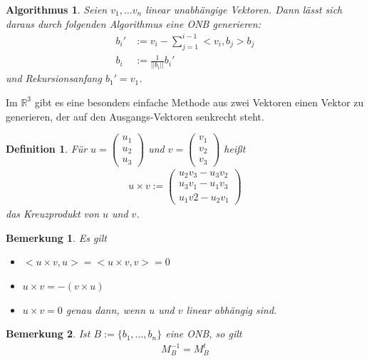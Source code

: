 \documentclass[]{article}
\newtheorem{Definition}{Definition}
\newtheorem{Bemerkung}{Bemerkung}
\newtheorem{Algorithmus}{Algorithmus}
\begin{document}
\begin{Algorithmus}
Seien  $v_1, \hdots v_n$ linear unabhängige Vektoren.  Dann lässt sich daraus durch folgenden Algorithmus 
eine ONB generieren: 
\begin {align*}
b_i ' & := v_i - \sum_{j=1}^{i-1} <v_i, b_j> b_j \\
b_i  & :=  \frac{1}{||b_i||} b_i'
\end{align*}
und Rekursionsanfang $b_1' = v_1$.
\end{Algorithmus}


Im $\mathbb{R}^3$ gibt es eine besonders einfache Methode aus zwei Vektoren einen Vektor zu generieren, der auf den Ausgangs-Vektoren
senkrecht steht.
\begin{Definition}
Für $u = \begin{pmatrix} u_1 \\ u_2 \\ u_3 \end{pmatrix}$ und $v= \begin{pmatrix} v_1 \\ v_2 \\ v_3 \end{pmatrix}$ heißt
\begin{align*}
u \times v :=  \begin{pmatrix} u_2 v_3 - u_3v_2  \\ u_3 v_1 - u_1v_3 \\ u_1 v2 - u_2 v_1\end{pmatrix} 
\end{align*}
das Kreuzprodukt von $u$ und $v$.
\end{Definition}

\begin{Bemerkung}
Es gilt
\begin{itemize}
\item $<u \times v, u> =  <u \times v, v> = 0$ 
\item $u \times v = - (v \times u)$
\item $u \times v = 0$ genau dann, wenn $u$ und $v$ linear abhängig sind.
\end{itemize}
\end{Bemerkung}

\begin{Bemerkung}
Ist  $B:= \{ b_1, \hdots , b_n \}$  eine ONB, so gilt
\begin{align*}
M_{B}^{-1} = M_{B}^t
\end{align*}
\end{Bemerkung}
\end{document}
